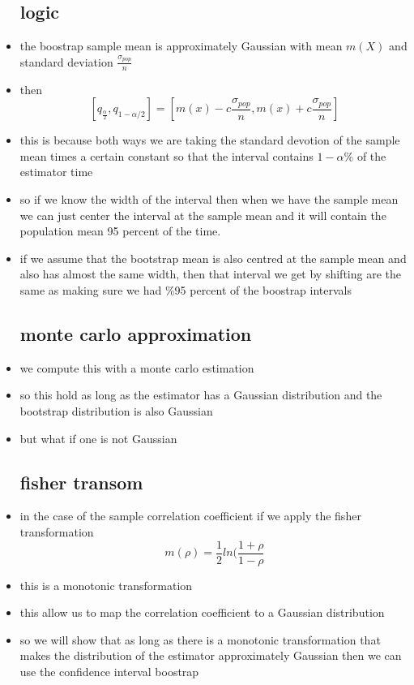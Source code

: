 \documentclass{article}
\begin{document}
\begin{itemize}
\subsection{logic}
\item the boostrap sample mean is approximately Gaussian with mean $m(X)$ and standard deviation $\frac{\sigma_{pop}}{n}$
\item then $$[q_{\frac{\alpha}{2}},q_{1-\alpha/2}]=[m(x)-c\frac{\sigma_{pop}}{n},m(x)+c\frac{\sigma_{pop}}{n}]$$
\item this is because both ways we are taking the standard devotion of the sample mean times a certain constant so that the interval contains $1-\alpha$\% of the estimator time
\item so if we know the width of the interval then when we have the sample mean we can just center the interval at the sample mean and it will contain the population mean 95 percent of the time. 
\item if we assume that the bootstrap mean is also centred at the sample mean and also has almost the same width, then that interval we get by shifting are the same as making sure we had \%95 percent of the boostrap intervals
\subsection{monte carlo approximation}
\item we compute this with a monte carlo estimation
\item so this hold as long as the estimator has a Gaussian distribution and the bootstrap distribution is also Gaussian 
\item but what if one is not Gaussian
\subsection{fisher transom}
\item in the case of the sample correlation coefficient if we apply the fisher transformation $$m(\rho)=\frac{1}{2}ln(\frac{1+\rho}{1-\rho}$$
\item this is a monotonic transformation 
\item this allow us to map the correlation coefficient to a Gaussian distribution 
\item so we will show that as long as there is a monotonic transformation that makes the distribution of the estimator approximately Gaussian then we can use the confidence  interval boostrap

\end{itemize}
\end{document}

